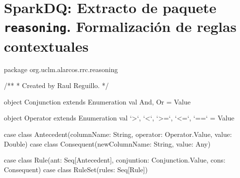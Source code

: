 \chapter{SparkDQ: Extracto de paquete \texttt{reasoning}. Formalización de reglas contextuales}
\label{reasoning-rule}
\begin{listing}[
  language = scala,
  numbers=left,
  numberstyle=\tiny,
  stepnumber=5,
  numbersep=5pt,
  frame=single,
  caption  = {SparkDQ: Formalización de reglas en SparkDQ},
  label    = code:sparkdq.reasoning]
package org.uclm.alarcos.rrc.reasoning

/**
  * Created by Raul Reguillo. 
  */

object Conjunction extends Enumeration {
  val And, Or = Value
}

object Operator extends Enumeration {
  val `>`, `<`, `>=`, `<=`, `==` = Value
}

case class Antecedent(columnName: String, operator: Operator.Value, value: Double)
case class Consequent(newColumnName: String, value: Any)

case class Rule(ant: Seq[Antecedent], conjuntion: Conjunction.Value, cons: Consequent)
case class RuleSet(rules: Seq[Rule])
\end{listing}
